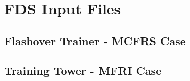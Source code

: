 \documentclass[11pt]{book}
\newcommand{\fdsinput}[1]{
{
\scriptsize

}
}
\begin{document}
\chapter{FDS Input Files}


\section{Flashover Trainer - MCFRS Case}
\fdsinput{MCFRS/MCFRS_Flashover/FDS_Input_Files/MCFRS_Flashover_00open.fds}



\section{Training Tower - MFRI Case}
\fdsinput{MFRI/MFRI_Training_Tower/FDS_Input_Files/MFRI_Training_Tower_01_avg.fds}
\end{document}
